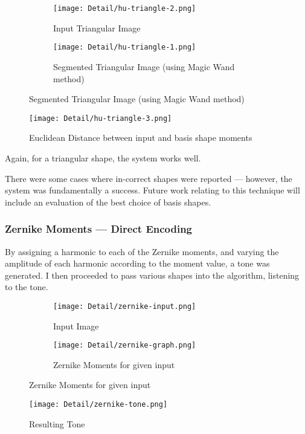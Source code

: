 \begin{figure}[H]
    \centering
    \begin{subfigure}[h]{0.4\textwidth}
        \centering
        \texttt{[image: Detail/hu-triangle-2.png]}
        \caption{Input Triangular Image}
    \end{subfigure}
    \begin{subfigure}[h]{0.4\textwidth}
        \centering
        \texttt{[image: Detail/hu-triangle-1.png]}
        \caption{Segmented Triangular Image (using Magic Wand method)}
    \end{subfigure}
\end{figure}

\begin{figure}[H]
    \centering
    \texttt{[image: Detail/hu-triangle-3.png]}
    \caption{Euclidean Distance between input and basis shape moments}
\end{figure}

Again, for a triangular shape, the system works well.

There were some cases where in-correct shapes were reported --- however, the system was fundamentally a success. Future work relating to this technique will include an evaluation of the best choice of basis shapes.

\subsubsection{Zernike Moments --- Direct Encoding}
By assigning a harmonic to each of the Zernike moments, and varying the amplitude of each harmonic according to the moment value, a tone was generated. I then proceeded to pass various shapes into the algorithm, listening to the tone.

\begin{figure}[H]
    \centering
    \begin{subfigure}[h]{0.2\textwidth}
        \centering
        \texttt{[image: Detail/zernike-input.png]}
        \caption{Input Image}
    \end{subfigure}
    \begin{subfigure}[h]{0.7\textwidth}
        \centering
        \texttt{[image: Detail/zernike-graph.png]}
        \caption{Zernike Moments for given input}
    \end{subfigure}
\end{figure}

\begin{figure}[H]
    \centering
    \texttt{[image: Detail/zernike-tone.png]}
    \caption{Resulting Tone}
\end{figure}

